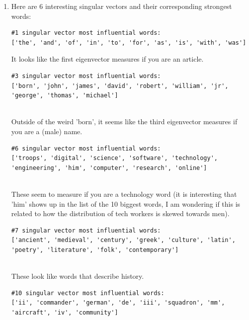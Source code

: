 \documentclass[12pt]{article}
\theoremstyle{definitionstyle}
\begin{document}
\begin{enumerate}[leftmargin=\labelsep]
\begin{enumerate}[label=\textbf{(\alph*)}]
            \item Here are 6 interesting singular vectors and their corresponding strongest words:
            \begin{lstlisting}
#1 singular vector most influential words:  
['the', 'and', 'of', 'in', 'to', 'for', 'as', 'is', 'with', 'was']
                \end{lstlisting}

                It looks like the first eigenvector measures if you are an article.
                
                \begin{lstlisting}
#3 singular vector most influential words:  
['born', 'john', 'james', 'david', 'robert', 'william', 'jr', 'george', 'thomas', 'michael']
                
                \end{lstlisting}

                Outside of the weird 'born', it seems like the third eigenvector measures if you are a (male) name.
                
                \begin{lstlisting}
#6 singular vector most influential words:  
['troops', 'digital', 'science', 'software', 'technology', 'engineering', 'him', 'computer', 'research', 'online']
                
                \end{lstlisting}

                These seem to measure if you are a technology word (it is interesting that 'him' shows up in the list of the 10 biggest words, I am wondering if this is related to how the distribution of tech workers is skewed towards men).
                
                \begin{lstlisting}
#7 singular vector most influential words:  
['ancient', 'medieval', 'century', 'greek', 'culture', 'latin', 'poetry', 'literature', 'folk', 'contemporary']
                
                \end{lstlisting}

                These look like words that describe history.
                
                \begin{lstlisting}
#10 singular vector most influential words: 
['ii', 'commander', 'german', 'de', 'iii', 'squadron', 'mm', 'aircraft', 'iv', 'community']
                

\end{lstlisting}
\end{enumerate}
\end{enumerate}
\end{document}

